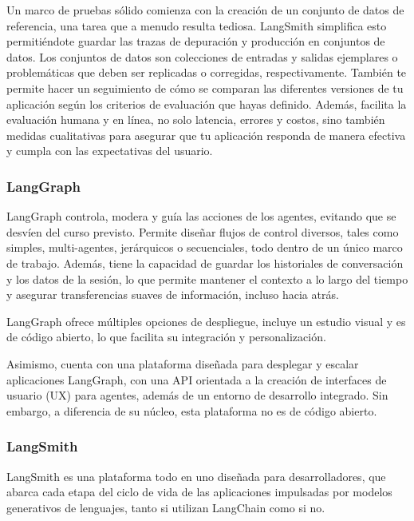 Un marco de pruebas sólido comienza con la creación de un conjunto de datos de referencia, una tarea que a menudo resulta tediosa. LangSmith simplifica esto permitiéndote guardar las trazas de depuración y producción en conjuntos de datos. Los conjuntos de datos son colecciones de entradas y salidas ejemplares o problemáticas que deben ser replicadas o corregidas, respectivamente. También te permite hacer un seguimiento de cómo se comparan las diferentes versiones de tu aplicación según los criterios de evaluación que hayas definido. Además, facilita la evaluación humana y en línea, no solo latencia, errores y costos, sino también medidas cualitativas para asegurar que tu aplicación responda de manera efectiva y cumpla con las expectativas del usuario. \cite{PaginaLangChainOficialEvaluacion}


 
\subsubsection{LangGraph}

LangGraph controla, modera y guía las acciones de los agentes, evitando que se desvíen del curso previsto. Permite diseñar flujos de control diversos, tales como simples, multi-agentes, jerárquicos o secuenciales, todo dentro de un único marco de trabajo. Además, tiene la capacidad de guardar los historiales de conversación y los datos de la sesión, lo que permite mantener el contexto a lo largo del tiempo y asegurar transferencias suaves de información, incluso hacia atrás.

LangGraph ofrece múltiples opciones de despliegue, incluye un estudio visual y es de código abierto, lo que facilita su integración y personalización.

Asimismo, cuenta con una plataforma diseñada para desplegar y escalar aplicaciones LangGraph, con una API orientada a la creación de interfaces de usuario (UX) para agentes, además de un entorno de desarrollo integrado. Sin embargo, a diferencia de su núcleo, esta plataforma no es de código abierto.\cite{PaginaLangChainOficialLangGraph}


 

\subsubsection{LangSmith}

LangSmith es una plataforma todo en uno diseñada para desarrolladores, que abarca cada etapa del ciclo de vida de las aplicaciones impulsadas por modelos generativos de lenguajes, tanto si utilizan LangChain como si no.

